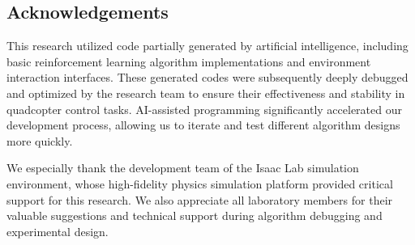 \documentclass[12pt]{article}
\begin{document}
\begin{center}
\section*{Acknowledgements}
\end{center}



This research utilized code partially generated by artificial intelligence, including basic reinforcement learning algorithm implementations and environment interaction interfaces. These generated codes were subsequently deeply debugged and optimized by the research team to ensure their effectiveness and stability in quadcopter control tasks. AI-assisted programming significantly accelerated our development process, allowing us to iterate and test different algorithm designs more quickly.

We especially thank the development team of the Isaac Lab simulation environment, whose high-fidelity physics simulation platform provided critical support for this research. We also appreciate all laboratory members for their valuable suggestions and technical support during algorithm debugging and experimental design.
\end{document}
